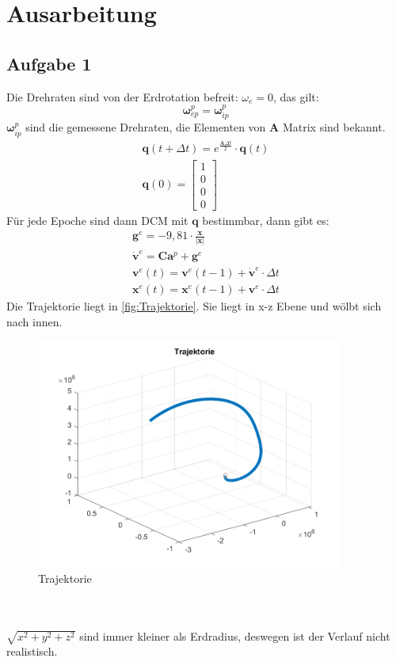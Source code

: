 \chapter{Ausarbeitung}
\section{Aufgabe 1}
Die Drehraten sind von der Erdrotation befreit: $\omega_e = 0$, das gilt:
\begin{equation*}
	\bm{\omega}_{ep}^p = \bm{\omega}_{ip}^p
\end{equation*}
$\bm{\omega}_{ip}^p$ sind die gemessene Drehraten, die Elementen von $\bm{A}$ Matrix sind bekannt. 
\begin{gather*}
	\bm{q}(t+\Delta t) = e^{\frac{\bm{A} \Delta t}{2}} \cdot \bm{q}(t) \\
	\bm{q}(0) = \begin{bmatrix}
		1 \\
		0 \\
		0 \\
		0
	\end{bmatrix}
\end{gather*}
Für jede Epoche sind dann DCM mit $\bm{q}$ bestimmbar, dann gibt es:
\begin{gather*}
	\bm{g}^{e} = -9,81 \cdot \frac{\bm{x}}{|\bm{x}|} \\
	\dot{\bm{v}}^{e} = \bm{C} \bm{a}^{p} + \bm{g}^{e} \\
	\bm{v}^{e}(t) = \bm{v}^{e}(t-1) + \dot{\bm{v}}^{e} \cdot \Delta t \\
	\bm{x}^{e}(t) = \bm{x}^{e}(t-1) + \bm{v}^{e} \cdot \Delta t
\end{gather*}
Die Trajektorie liegt in \autoref{fig:Trajektorie}. Sie liegt in x-z Ebene und wölbt sich nach innen. 
\begin{figure}[htbp]
	\centering
	\includegraphics[width=0.9\textwidth]{images/Trajektorie} 
	\caption{Trajektorie} 
	\label{fig:Trajektorie}
\end{figure}\\\\
$\sqrt{x^2 + y^2 + z^2}$ sind immer kleiner als Erdradius, deswegen ist der Verlauf nicht realistisch.
\clearpage
